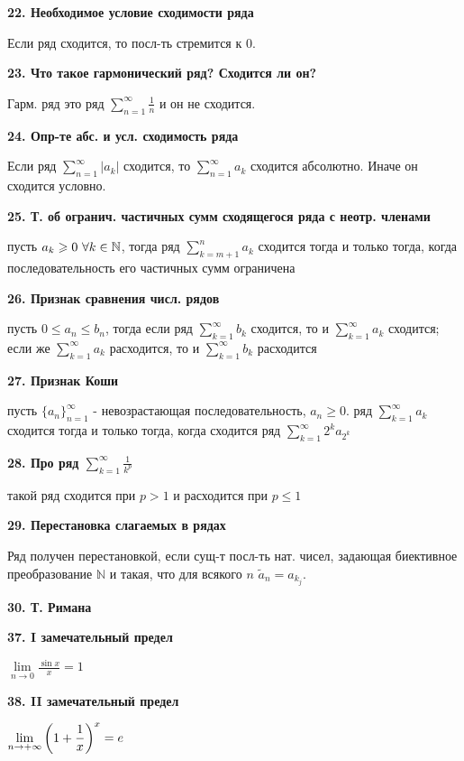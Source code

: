 	\textbf{22. Необходимое условие сходимости ряда}
	
	Если ряд сходится, то посл-ть стремится к 0.
	
	\textbf{23.  Что такое гармонический ряд? Сходится ли он?}
	
	Гарм. ряд это ряд  $\displaystyle \sum_{n=1}^{\infty}\frac1n$ и он не сходится.
	
	\textbf{24. Опр-те абс. и усл. сходимость ряда	}
	
	Если ряд $\displaystyle \sum_{n=1}^{\infty} |a_k|$ сходится, то $\displaystyle \sum_{n=1}^{\infty} a_k$ сходится абсолютно. Иначе он сходится условно.
	
	\textbf{25. Т. об огранич. частичных сумм сходящегося ряда с неотр. членами}
	
	пусть $a_k \geqslant 0 \ \forall k \in \mathbb{N}$, тогда ряд $\displaystyle\sum_{k = m + 1}^{n}a_k$ сходится тогда и только тогда, когда последовательность его частичных сумм ограничена
	
	\textbf{26. Признак сравнения числ. рядов}
	
	пусть $0 \le a_n \le b_n$, тогда если ряд $\displaystyle\sum_{k = 1}^{\infty}b_k$ сходится, то и $\displaystyle\sum_{k = 1}^{\infty}a_k$ сходится; если же $\displaystyle\sum_{k = 1}^{\infty}a_k$  расходится, то и $\displaystyle\sum_{k = 1}^{\infty}b_k$ расходится
	
	\textbf{27. Признак Коши}
	
	пусть $ \textstyle\{a_n\}_{n=1}^{\infty}$ - невозрастающая последовательность, $a_n \geq 0$. ряд $\displaystyle\sum_{k = 1}^{\infty}a_k$ сходится тогда и только тогда, когда сходится ряд $\displaystyle\sum_{k = 1}^{\infty}2^ka_{2^k}$
	
	\textbf{28. Про ряд $\displaystyle \sum_{k=1}^{\infty} \frac{1}{k^p}$}
	
	такой ряд сходится при $p > 1$ и расходится при $p \leq 1$
	
	\textbf{29. Перестановка слагаемых в рядах}
	
	Ряд получен перестановкой, если сущ-т посл-ть нат. чисел, задающая биективное преобразование $\mathbb{N}$  и такая, что для всякого $n$ $\tilde{a}_n = a_{k_j}$.	
	
	\textbf{30. Т. Римана}
	
	
	\textbf{37. I замечательный предел}
	
	$\displaystyle \lim\limits_{n\rightarrow0} \frac{\sin x}{x} = 1$
	
	\textbf{38. II замечательный предел}
	
	$\displaystyle \lim\limits_{n\rightarrow+\infty}  \left( 1 + \frac{1}{x}\right)^x = e$
	
